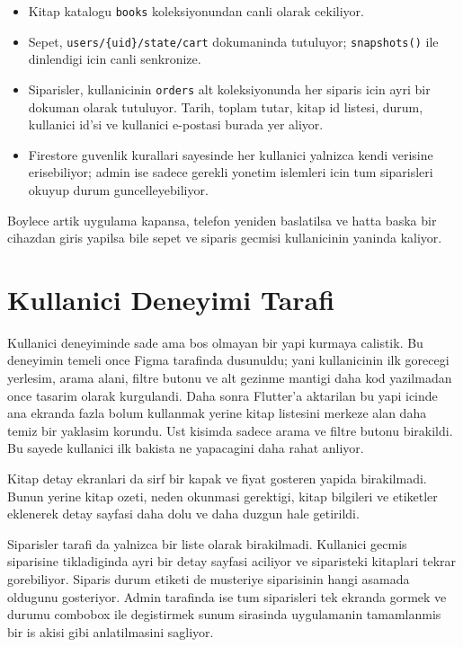 \documentclass[12pt,a4paper]{article}
\begin{document}
\begin{itemize}
  \item Kitap katalogu \verb|books| koleksiyonundan canli olarak cekiliyor.
  \item Sepet, \verb|users/{uid}/state/cart| dokumaninda tutuluyor; \verb|snapshots()| ile dinlendigi icin canli senkronize.
  \item Siparisler, kullanicinin \verb|orders| alt koleksiyonunda her siparis icin ayri bir dokuman olarak tutuluyor. Tarih, toplam tutar, kitap id listesi, durum, kullanici id'si ve kullanici e-postasi burada yer aliyor.
  \item Firestore guvenlik kurallari sayesinde her kullanici yalnizca kendi verisine erisebiliyor; admin ise sadece gerekli yonetim islemleri icin tum siparisleri okuyup durum guncelleyebiliyor.
\end{itemize}

Boylece artik uygulama kapansa, telefon yeniden baslatilsa ve hatta baska bir cihazdan giris yapilsa bile sepet ve siparis gecmisi kullanicinin yaninda kaliyor.

\section{Kullanici Deneyimi Tarafi}

Kullanici deneyiminde sade ama bos olmayan bir yapi kurmaya calistik. Bu deneyimin temeli once Figma tarafinda dusunuldu; yani kullanicinin ilk gorecegi yerlesim, arama alani, filtre butonu ve alt gezinme mantigi daha kod yazilmadan once tasarim olarak kurgulandi. Daha sonra Flutter'a aktarilan bu yapi icinde ana ekranda fazla bolum kullanmak yerine kitap listesini merkeze alan daha temiz bir yaklasim korundu. Ust kisimda sadece arama ve filtre butonu birakildi. Bu sayede kullanici ilk bakista ne yapacagini daha rahat anliyor.

Kitap detay ekranlari da sirf bir kapak ve fiyat gosteren yapida birakilmadi. Bunun yerine kitap ozeti, neden okunmasi gerektigi, kitap bilgileri ve etiketler eklenerek detay sayfasi daha dolu ve daha duzgun hale getirildi.

Siparisler tarafi da yalnizca bir liste olarak birakilmadi. Kullanici gecmis siparisine tikladiginda ayri bir detay sayfasi aciliyor ve siparisteki kitaplari tekrar gorebiliyor. Siparis durum etiketi de musteriye siparisinin hangi asamada oldugunu gosteriyor. Admin tarafinda ise tum siparisleri tek ekranda gormek ve durumu combobox ile degistirmek sunum sirasinda uygulamanin tamamlanmis bir is akisi gibi anlatilmasini sagliyor.
\end{document}
